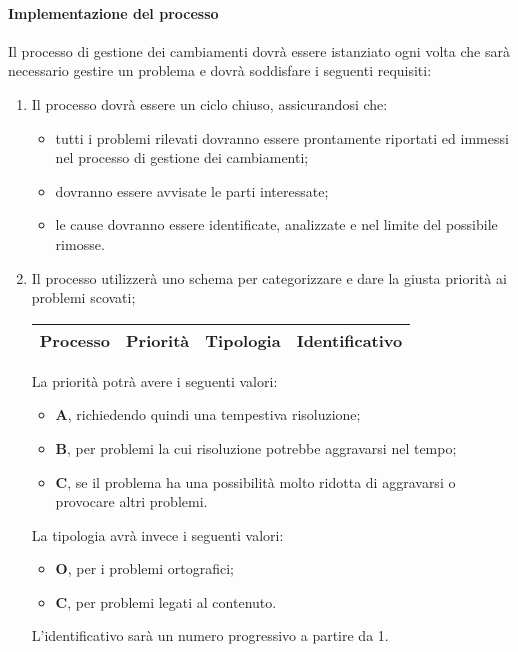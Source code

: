 		\paragraph{Implementazione del processo}
			Il processo di gestione dei cambiamenti dovrà essere istanziato ogni volta che sarà necessario gestire un problema e dovrà soddisfare i seguenti requisiti:
			\begin{enumerate}
				\item Il processo dovrà essere un ciclo chiuso, assicurandosi che:
					\begin{itemize}
				 		\item tutti i problemi rilevati dovranno essere prontamente riportati ed immessi nel processo di gestione dei cambiamenti;
					 	\item dovranno essere avvisate le parti interessate;
				 		\item le cause dovranno essere identificate, analizzate e nel limite del possibile rimosse.
					 \end{itemize}

				\item Il processo utilizzerà uno schema per categorizzare e dare la giusta priorità ai problemi scovati;

					\begin{center}
						\begin{longtable}{|c|c|c|c|}
							\hline
							\rowcolor{lighter-grayer}
							\textbf{Processo} & \textbf{Priorità} & \textbf{Tipologia} & \textbf{Identificativo}\\
							\hline
							\endfirsthead
							\hline

						\end{longtable}
					\end{center}

				 La priorità potrà avere i seguenti valori:
					\begin{itemize}
					 	\item \textbf{A}, richiedendo quindi una tempestiva risoluzione;
					 	\item \textbf{B}, per problemi la cui risoluzione potrebbe aggravarsi nel tempo;
					 	\item \textbf{C}, se il problema ha una possibilità molto ridotta di aggravarsi o provocare altri problemi.
					 \end{itemize}
				 La tipologia avrà invece i seguenti valori:
					\begin{itemize}
						\item \textbf{O}, per i problemi ortografici;
						\item \textbf{C}, per problemi legati al contenuto.
					\end{itemize}
				 L'identificativo sarà un numero progressivo a partire da 1.


\end{enumerate}
